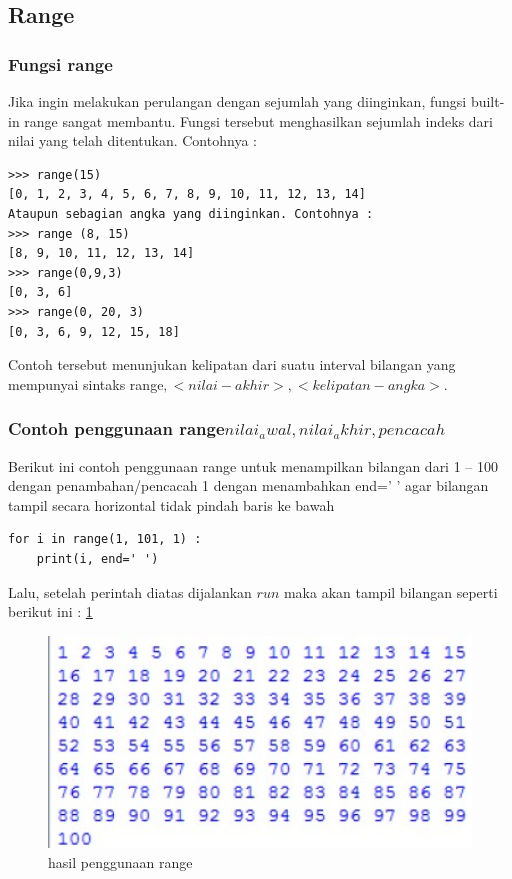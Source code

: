 \subsection{Range}
\subsubsection{Fungsi range\(\)}
Jika ingin melakukan perulangan dengan sejumlah yang diinginkan, fungsi built-in range sangat membantu. Fungsi tersebut menghasilkan sejumlah indeks dari nilai yang telah ditentukan. 
Contohnya :
\begin{verbatim}
>>> range(15)
[0, 1, 2, 3, 4, 5, 6, 7, 8, 9, 10, 11, 12, 13, 14]
Ataupun sebagian angka yang diinginkan. Contohnya :
>>> range (8, 15)
[8, 9, 10, 11, 12, 13, 14]
>>> range(0,9,3)
[0, 3, 6]
>>> range(0, 20, 3)
[0, 3, 6, 9, 12, 15, 18]
\end{verbatim}
 Contoh tersebut menunjukan kelipatan dari suatu interval bilangan yang mempunyai sintaks range\(<nilai-awal>, <nilai-akhir>, <kelipatan-angka>\).
\subsubsection{Contoh penggunaan range\(nilai_awal,nilai_akhir,pencacah\)}
Berikut ini contoh penggunaan range untuk menampilkan bilangan dari 1 – 100 dengan penambahan/pencacah 1 dengan menambahkan end=’ ’ agar bilangan tampil secara horizontal tidak pindah baris ke bawah
\begin{verbatim}
for i in range(1, 101, 1) :
    print(i, end=' ')
\end{verbatim}
Lalu, setelah perintah diatas dijalankan \(run\) maka akan tampil bilangan seperti berikut ini :
\ref{2range}

\begin{figure}[ht]
    \centerline{\includegraphics[width=1\textwidth]{figures/2range.JPG}}
    \caption{hasil penggunaan range}
    \label{2range}
    \end{figure}
    
